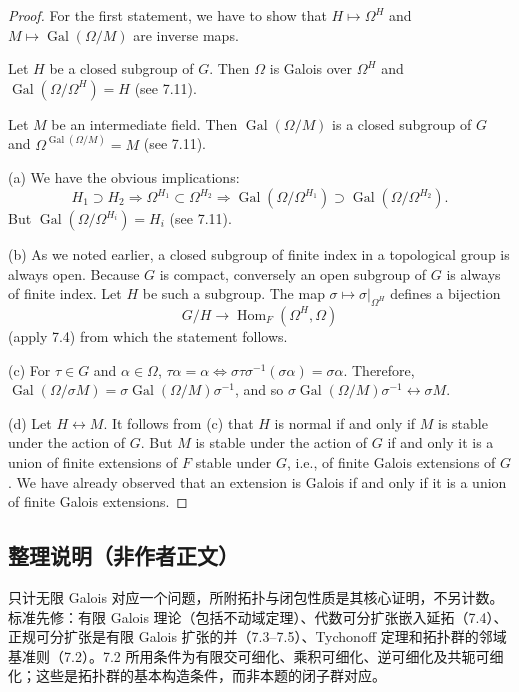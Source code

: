 \documentclass[UTF8,11pt]{ctexart}
\theoremstyle{definition}
\DeclareMathOperator{\Hom}{Hom}
\begin{document}
\begin{proof}
For the first statement, we have to show that $H\mapsto\Omega^H$ and $M\mapsto\operatorname{Gal}(\Omega/M)$ are inverse maps.

Let $H$ be a closed subgroup of $G$. Then $\Omega$ is Galois over $\Omega^H$ and $\operatorname{Gal}(\Omega/\Omega^H)=H$ (see 7.11).

Let $M$ be an intermediate field. Then $\operatorname{Gal}(\Omega/M)$ is a closed subgroup of $G$ and $\Omega^{\operatorname{Gal}(\Omega/M)}=M$ (see 7.11).

(a) We have the obvious implications:
\[
H_1\supset H_2\Longrightarrow\Omega^{H_1}\subset\Omega^{H_2}
\Longrightarrow\operatorname{Gal}(\Omega/\Omega^{H_1})\supset\operatorname{Gal}(\Omega/\Omega^{H_2}).
\]
But $\operatorname{Gal}(\Omega/\Omega^{H_i})=H_i$ (see 7.11).

(b) As we noted earlier, a closed subgroup of finite index in a topological group is always open. Because $G$ is compact, conversely an open subgroup of $G$ is always of finite index. Let $H$ be such a subgroup. The map $\sigma\mapsto\sigma|_{\Omega^H}$ defines a bijection
\[
G/H\longrightarrow\Hom_F(\Omega^H,\Omega)
\]
(apply 7.4) from which the statement follows.

(c) For $\tau\in G$ and $\alpha\in\Omega$, $\tau\alpha=\alpha\Longleftrightarrow\sigma\tau\sigma^{-1}(\sigma\alpha)=\sigma\alpha$. Therefore, $\operatorname{Gal}(\Omega/\sigma M)=\sigma\operatorname{Gal}(\Omega/M)\sigma^{-1}$, and so $\sigma\operatorname{Gal}(\Omega/M)\sigma^{-1}\leftrightarrow\sigma M$.

(d) Let $H\leftrightarrow M$. It follows from (c) that $H$ is normal if and only if $M$ is stable under the action of $G$. But $M$ is stable under the action of $G$ if and only it is a union of finite extensions of $F$ stable under $G$, i.e., of finite Galois extensions of $G$. We have already observed that an extension is Galois if and only if it is a union of finite Galois extensions.
\end{proof}

\subsection*{整理说明（非作者正文）}
只计无限 Galois 对应一个问题，所附拓扑与闭包性质是其核心证明，不另计数。标准先修：有限 Galois 理论（包括不动域定理）、代数可分扩张嵌入延拓（7.4）、正规可分扩张是有限 Galois 扩张的并（7.3--7.5）、Tychonoff 定理和拓扑群的邻域基准则（7.2）。7.2 所用条件为有限交可细化、乘积可细化、逆可细化及共轭可细化；这些是拓扑群的基本构造条件，而非本题的闭子群对应。
\end{document}
